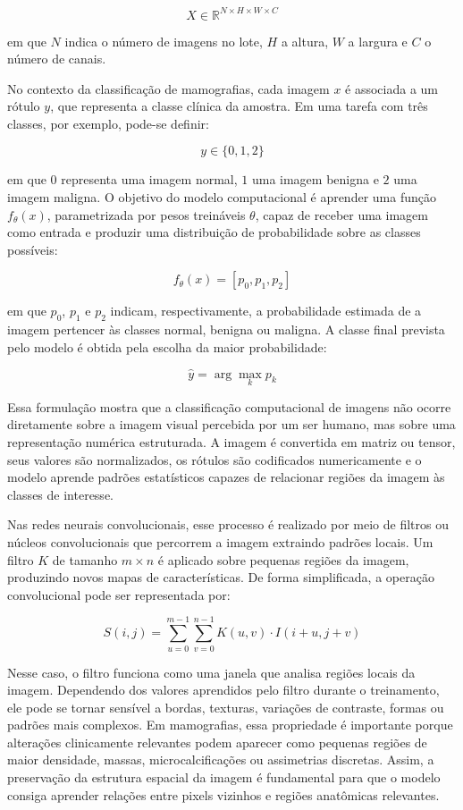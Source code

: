 \documentclass[
    12pt,
    openright,
    oneside,
    a4paper,
    english,
    brazil
]{abntex2}
\begin{document}
\[
X \in \mathbb{R}^{N \times H \times W \times C}
\]

em que \(N\) indica o número de imagens no lote, \(H\) a altura, \(W\) a largura e \(C\) o número de canais.

No contexto da classificação de mamografias, cada imagem \(x\) é associada a um rótulo \(y\), que representa a classe clínica da amostra. Em uma tarefa com três classes, por exemplo, pode-se definir:

\[
y \in \{0, 1, 2\}
\]

em que \(0\) representa uma imagem normal, \(1\) uma imagem benigna e \(2\) uma imagem maligna. O objetivo do modelo computacional é aprender uma função \(f_{\theta}(x)\), parametrizada por pesos treináveis \(\theta\), capaz de receber uma imagem como entrada e produzir uma distribuição de probabilidade sobre as classes possíveis:

\[
f_{\theta}(x) = [p_0, p_1, p_2]
\]

em que \(p_0\), \(p_1\) e \(p_2\) indicam, respectivamente, a probabilidade estimada de a imagem pertencer às classes normal, benigna ou maligna. A classe final prevista pelo modelo é obtida pela escolha da maior probabilidade:

\[
\hat{y} = \arg\max_{k} p_k
\]

Essa formulação mostra que a classificação computacional de imagens não ocorre diretamente sobre a imagem visual percebida por um ser humano, mas sobre uma representação numérica estruturada. A imagem é convertida em matriz ou tensor, seus valores são normalizados, os rótulos são codificados numericamente e o modelo aprende padrões estatísticos capazes de relacionar regiões da imagem às classes de interesse.

Nas redes neurais convolucionais, esse processo é realizado por meio de filtros ou núcleos convolucionais que percorrem a imagem extraindo padrões locais. Um filtro \(K\) de tamanho \(m \times n\) é aplicado sobre pequenas regiões da imagem, produzindo novos mapas de características. De forma simplificada, a operação convolucional pode ser representada por:

\[
S(i,j) = \sum_{u=0}^{m-1}\sum_{v=0}^{n-1} K(u,v) \cdot I(i+u,j+v)
\]

Nesse caso, o filtro funciona como uma janela que analisa regiões locais da imagem. Dependendo dos valores aprendidos pelo filtro durante o treinamento, ele pode se tornar sensível a bordas, texturas, variações de contraste, formas ou padrões mais complexos. Em mamografias, essa propriedade é importante porque alterações clinicamente relevantes podem aparecer como pequenas regiões de maior densidade, massas, microcalcificações ou assimetrias discretas. Assim, a preservação da estrutura espacial da imagem é fundamental para que o modelo consiga aprender relações entre pixels vizinhos e regiões anatômicas relevantes.
\end{document}
